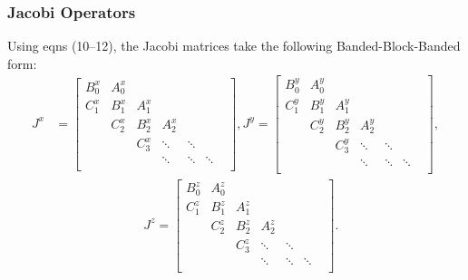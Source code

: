 \documentclass[10pt]{beamer}
\begin{document}
\frame
{
    \frametitle{Jacobi Operators}
Using eqns (10--12), the Jacobi matrices take the following Banded-Block-Banded form:
\begin{align}
J^x &= \begin{bmatrix}
		B^x_0 & A^x_0 & & & & \\
		C^x_1 & B^x_1 & A^x_1 & & & \\
		& C^x_2 & B^x_2 & A^x_2  & & & \\
		& & C^x_3 & \ddots & \ddots & \\
		& & & \ddots & \ddots & \ddots \\
	\end{bmatrix},
J^y = \begin{bmatrix}
		B^y_0 & A^y_0 & & & & \\
		C^y_1 & B^y_1 & A^y_1 & & & \\
		& C^y_2 & B^y_2 & A^y_2  & & & \\
		& & C^y_3 & \ddots & \ddots & \\
		& & & \ddots & \ddots & \ddots \\
	\end{bmatrix}, \nonumber \\
&\quad \quad \quad \quad \quad \quad \quad J^z = \begin{bmatrix}
		B^z_0 & A^z_0 & & & & \\
		C^z_1 & B^z_1 & A^z_1 & & & \\
		& C^z_2 & B^z_2 & A^z_2  & & & \\
		& & C^z_3 & \ddots & \ddots & \\
		& & & \ddots & \ddots & \ddots \\
	\end{bmatrix}.
\end{align}

}
\end{document}
